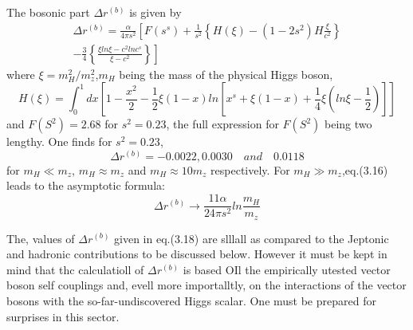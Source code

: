 {The bosonic part $\Delta r^{(b)}$ is given by
\begin{multline*}
\Delta r^{(b)} = \frac{\alpha}{4 \pi s^{2}} \left[F(s^{s}) +\frac{1}{s^{2}} \left\{H(\xi) - (1-2 s^{2})H \frac{\xi}{c^{2}} \right\} \right.\tag{3.16}\\
\left.-\frac{3}{4} \left\{\frac{\xi ln \xi - c^{2} ln c^{s}}{\xi-c^{2}} \right\}\right]
\end{multline*}
where $\xi= m^{2}_{H}/m^{2}_{z}$,$m_{H}$ being the mass of the physical Higgs boson,
\begin{equation*}
H(\xi) = \int^{1}_{0} dx \left[1-\frac{x^{2}}{2} -\frac{1}{2}\xi(1-x) ln [x^{s} +\xi(1-x)+\frac{1}{4}\xi\left(ln \xi-\frac{1}{2}\right)] \right]\tag{3.17}
\end{equation*}
and $F(S^{2}) = 2.68$ for $s^{2} = 0.23$, the full expression for $F(S^{2})$ being two lengthy.
One finds for $s^{2}=0.23$,
\begin{equation*}
\Delta r^{(b)}=-0.0022,0.0030\quad and \quad  0.0118\tag{3.18}
\end{equation*} 
for $m_{H} \ll m_{z}$, $m_{H} \approx m_{z}$ and $m_{H} \approx 10m_{z}$ respectively. For $m_{H} \gg m_{z}$,eq.(3.16) leads to the asymptotic formula:
$$
\Delta r^{(b)} \rightarrow \frac{11 \alpha}{24 \pi s^{2}}ln \frac{m_{H}}{m_{z}}
$$ 

The, values of $\Delta r^{(b)}$ given in eq.(3.18) are slllall as compared to the Jeptonic
and hadronic contributions to be discussed below. However it must be kept in mind that thc calculatioll of $\Delta r^{(b)}$ is based OIl the empirically utested vector
boson self couplings and, evell more importalltly, on the interactions of the
vector bosons with the so-far-undiscovered Higgs scalar. One must be prepared
for surprises in this sector. 


}
